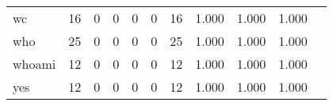 \begin{longtable}{lp{1.2cm}p{1.2cm}p{1.2cm}p{1.2cm}p{1.2cm}p{1.2cm}p{1.2cm}p{1.2cm}p{1.2cm}p{1.2cm}}
wc        &                                    16 &                                                  0 &                                                  0 &                                                  0 &                                                  0 &                                                 16 &                                              1.000 &                                              1.000 &                                              1.000 \\
who       &                                    25 &                                                  0 &                                                  0 &                                                  0 &                                                  0 &                                                 25 &                                              1.000 &                                              1.000 &                                              1.000 \\
whoami    &                                    12 &                                                  0 &                                                  0 &                                                  0 &                                                  0 &                                                 12 &                                              1.000 &                                              1.000 &                                              1.000 \\
yes       &                                    12 &                                                  0 &                                                  0 &                                                  0 &                                                  0 &                                                 12 &                                              1.000 &                                              1.000 &                                              1.000 \\
\end{longtable}
